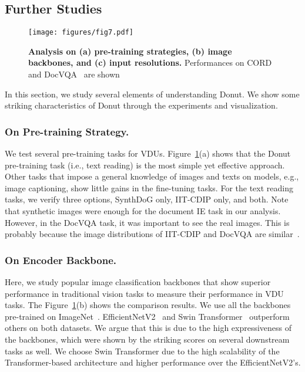 \documentclass[runningheads]{llncs}
\newcommand\ours{{{\mbox{Donut}}}\xspace}
\begin{document}
\subsection{Further Studies}
\label{sec:ablation_and_analysis}

\begin{figure}[t]
    \centering
    \texttt{[image: figures/fig7.pdf]}
    \caption{\textbf{Analysis on (a) pre-training strategies, (b) image backbones, and (c) input resolutions.} Performances on CORD~\cite{park2019cord} and DocVQA~\cite{mathew2021docvqa} are shown} \label{fig:analysis_ablation}
\end{figure}


In this section, we study several elements of understanding \ours. We show some striking characteristics of \ours through the experiments and visualization.


\subsubsection{On Pre-training Strategy.}
We test several pre-training tasks for VDUs. Figure~\ref{fig:analysis_ablation}(a) shows that the \ours pre-training task (i.e., text reading) is the most simple yet effective approach. Other tasks that impose a general knowledge of images and texts on models, e.g., image captioning, show little gains in the fine-tuning tasks.
For the text reading tasks, we verify three options, SynthDoG only, IIT-CDIP only, and both.
Note that synthetic images were enough for the document IE task in our analysis. 
However, in the DocVQA task, it was important to see the real images. 
This is probably because the image distributions of IIT-CDIP and DocVQA are similar~\cite{mathew2021docvqa}.


\subsubsection{On Encoder Backbone.}
Here, we study popular image classification backbones that show superior performance in traditional vision tasks to measure their performance in VDU tasks.
The Figure~\ref{fig:analysis_ablation}(b) shows the comparison results. We use all the backbones pre-trained on ImageNet~\cite{deng2009imagenet}.
EfficientNetV2~\cite{tan2021efficientnetv2} and Swin Transformer~\cite{Liu_2021_ICCV} outperform others on both datasets. We argue that this is due to the high expressiveness of the backbones, which were shown by the striking scores on several downstream tasks as well.
We choose Swin Transformer due to the high scalability of the Transformer-based architecture and higher performance over the EfficientNetV2's.
\end{document}
